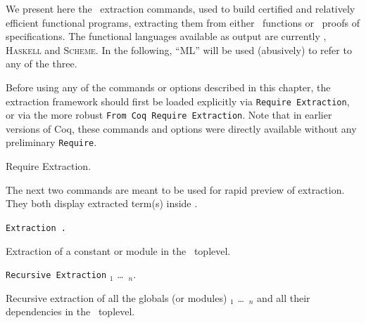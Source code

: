 \label{Extraction}

\noindent We present here the \Coq\ extraction commands, used to build certified
and relatively efficient functional programs, extracting them from
either \Coq\ functions or \Coq\ proofs of specifications. The
functional languages available as output are currently \ocaml{},
\textsc{Haskell} and \textsc{Scheme}.  In the following, ``ML'' will
be used (abusively) to refer to any of the three.


Before using any of the commands or options described in this chapter,
the extraction framework should first be loaded explicitly
via {\tt Require Extraction}, or via the more robust
{\tt From Coq Require Extraction}.
Note that in earlier versions of Coq, these commands and options were
directly available without any preliminary {\tt Require}.

\begin{coq_example}
Require Extraction.
\end{coq_example}


The next two commands are meant to be used for rapid preview of
extraction. They both display extracted term(s) inside \Coq.

\begin{description}
\item {\tt Extraction \qualid{}.} ~\par
  Extraction of a constant or module in the \Coq\ toplevel.

\item {\tt Recursive Extraction} \qualid$_1$ \dots\ \qualid$_n$. ~\par
  Recursive extraction of all the globals (or modules) \qualid$_1$ \dots\
  \qualid$_n$ and all their dependencies in the \Coq\ toplevel.
\end{description}

